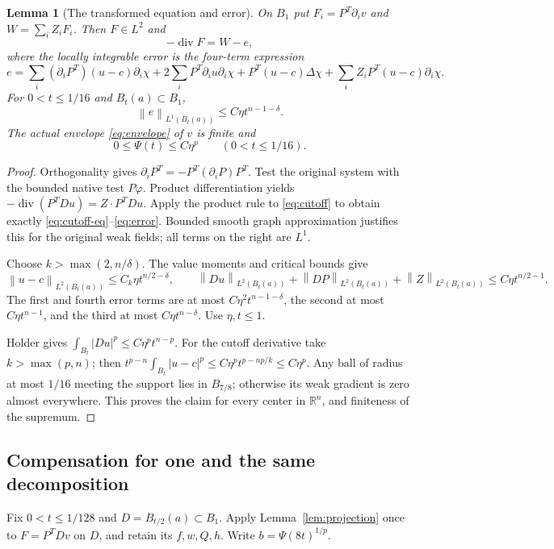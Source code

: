 \documentclass[11pt,a4paper]{article}
\numberwithin{equation}{section}
\newtheorem{lemma}[theorem]{Lemma}
\theoremstyle{definition}
\theoremstyle{remark}
\newcommand{\R}{\mathbb R}
\newcommand{\diver}{\operatorname{div}}
\newcommand{\norm}[1]{\left\lVert#1\right\rVert}
\begin{document}
\begin{lemma}[The transformed equation and error]\label{lem:cutoff}
On $B_1$ put $F_i=P^T\partial_i v$ and $W=\sum_iZ_iF_i$.
Then $F\in L^2$ and
\begin{equation}\label{eq:cutoff-eq}
 -\diver F=W-e,
\end{equation}
where the locally integrable error is the four-term expression
\begin{equation}\label{eq:error}
 e=\sum_i(\partial_iP^T)(u-c)\partial_i\chi
   +2\sum_iP^T\partial_i u\partial_i\chi
   +P^T(u-c)\Delta\chi
   +\sum_i Z_iP^T(u-c)\partial_i\chi.
\end{equation}
For $0<t\leq1/16$ and $B_t(a)\subset B_1$,
\begin{equation}\label{eq:error-L1}
 \norm e_{L^1(B_t(a))}\leq C\eta t^{n-1-\delta}.
\end{equation}
The actual envelope \eqref{eq:envelope} of $v$ is finite and
\begin{equation}\label{eq:initial-envelope}
 0\leq\Psi(t)\leq C\eta^p\qquad(0<t\leq1/16).
\end{equation}
\end{lemma}
\begin{proof}
Orthogonality gives $\partial_iP^T=-P^T(\partial_iP)P^T$. Test the
original system with the bounded native test $P\varphi$. Product
differentiation yields $-\diver(P^TDu)=Z\cdot P^TDu$. Apply the
product rule to \eqref{eq:cutoff} to obtain exactly
\eqref{eq:cutoff-eq}--\eqref{eq:error}. Bounded smooth graph
approximation justifies this for the original weak fields; all terms
on the right are $L^1$.

Choose $k>\max(2,n/\delta)$. The value moments and critical bounds give
\[
 \norm{u-c}_{L^2(B_t(a))}\leq C_k\eta t^{n/2-\delta},\qquad
 \norm{Du}_{L^2(B_t(a))}+\norm{DP}_{L^2(B_t(a))}
 +\norm Z_{L^2(B_t(a))}\leq C\eta t^{n/2-1}.
\]
The first and fourth error terms are at most
$C\eta^2t^{n-1-\delta}$, the second at most $C\eta t^{n-1}$, and
the third at most $C\eta t^{n-\delta}$. Use $\eta,t\leq1$.

Holder gives $\int_{B_t}|Du|^p\leq C\eta^pt^{n-p}$. For the
cutoff derivative take $k>\max(p,n)$; then
$t^{p-n}\int_{B_t}|u-c|^p\leq C\eta^pt^{p-np/k}\leq C\eta^p$.
Any ball of radius at most $1/16$ meeting the support lies in $B_{7/8}$;
otherwise its weak gradient is zero almost everywhere. This proves the
claim for every center in $\R^n$, and finiteness of the supremum.
\end{proof}

\subsection{Compensation for one and the same decomposition}\label{sec:same-fields}
Fix $0<t\leq1/128$ and $D=B_{t/2}(a)\subset B_1$. Apply
Lemma~\ref{lem:projection} once to $F=P^TDv$ on $D$, and retain its
$f,w,Q,h$. Write $b=\Psi(8t)^{1/p}$.
\end{document}
